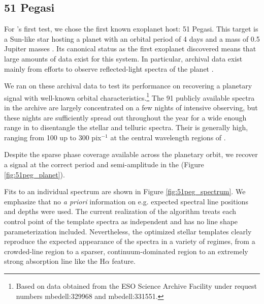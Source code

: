 \documentclass[modern]{aastex62}
\begin{document}
\subsection{51 Pegasi}

For \wobble's first test, we chose the first known exoplanet host: 51 Pegasi.
This target is a Sun-like star hosting a planet with an orbital period of 4 days and a mass of 0.5 Jupiter masses \citep{Mayor1995}.
Its canonical status as the first exoplanet discovered means that large amounts of data exist for this system.
In particular, archival \HARPS data exist mainly from efforts to observe reflected-light spectra of the planet \citep{Martins2015}.

We ran \wobble on these archival data to test its performance on recovering a planetary signal with well-known orbital characteristics.\footnote{Based on data obtained from the ESO Science Archive Facility under request numbers mbedell:329968 and mbedell:331551.}
The 91 publicly available spectra in the \HARPS archive are largely concentrated on a few nights of intensive observing, but these nights are sufficiently spread out throughout the year for a wide enough range in \BERV to disentangle the stellar and telluric spectra.
Their \SNR is generally high, ranging from 100 up to 300 pix$^{-1}$ at the central wavelength regions of \HARPS.

Despite the sparse phase coverage available across the planetary orbit, we recover a signal at the correct period and semi-amplitude in the \RVs (Figure \ref{fig:51peg_planet}). 

Fits to an individual spectrum are shown in Figure \ref{fig:51peg_spectrum}.
We emphasize that no \textit{a priori} information on e.g. expected spectral line positions and depths were used.
The current realization of the \wobble algorithm treats each control point of the template spectra as independent and has no line shape parameterization included.
Nevertheless, the optimized stellar templates clearly reproduce the expected appearance of the spectra in a variety of regimes, from a crowded-line region to a sparser, continuum-dominated region to an extremely strong absorption line like the H$\alpha$ feature.
\end{document}
